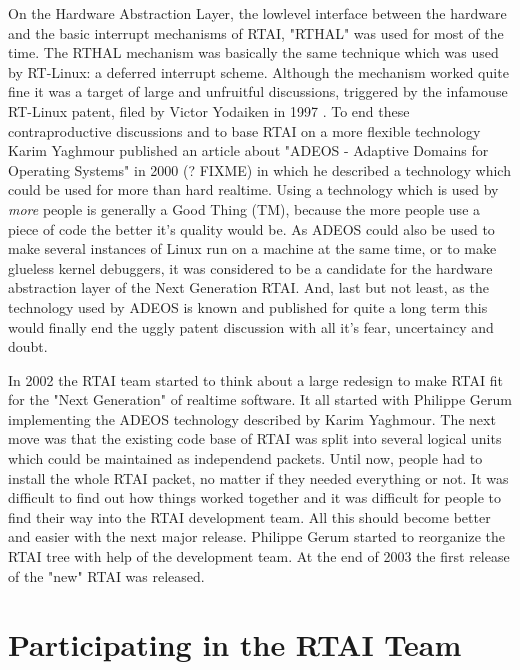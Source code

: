 On the Hardware Abstraction Layer, the lowlevel interface between the
hardware and the basic interrupt mechanisms of RTAI, "RTHAL" was used
for most of the time. The RTHAL mechanism was basically the same
technique which was used by RT-Linux: a deferred interrupt scheme.
Although the mechanism worked quite fine it was a target of large and
unfruitful discussions, triggered by the infamouse RT-Linux patent,
filed by Victor Yodaiken in 1997 \cite{LinuxDevices:InfamousPatent}. To
end these contraproductive discussions and to base RTAI on a more
flexible technology Karim Yaghmour published an article about "ADEOS -
Adaptive Domains for Operating Systems" in 2000 (? FIXME) in which he
described a technology which could be used for more than hard realtime.
Using a technology which is used by \emph{more} people is generally a
Good Thing (TM), because the more people use a piece of code the better
it's quality would be. As ADEOS could also be used to make several
instances of Linux run on a machine at the same time, or to make
glueless kernel debuggers, it was considered to be a candidate for the
hardware abstraction layer of the Next Generation RTAI. And, last but
not least, as the technology used by ADEOS is known and published for
quite a long term this would finally end the uggly patent discussion
with all it's fear, uncertaincy and doubt. 

In 2002 the RTAI team started to think about a large redesign to make
RTAI fit for the "Next Generation" of realtime software. It all started
with Philippe Gerum implementing the ADEOS technology described by Karim
Yaghmour. The next move was that the existing code base of RTAI was
split into several logical units which could be maintained as
independend packets. Until now, people had to install the whole RTAI
packet, no matter if they needed everything or not. It was difficult to
find out how things worked together and it was difficult for people to
find their way into the RTAI development team. All this should become
better and easier with the next major release. Philippe Gerum started to
reorganize the RTAI tree with help of the development team. At the end
of 2003 the first release of the "new" RTAI was released.  


\section{Participating in the RTAI Team}
\label{sec:preface:participating}

